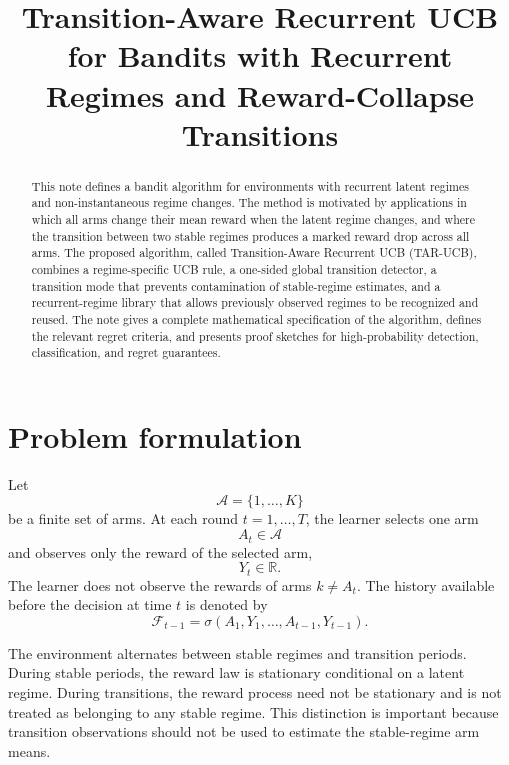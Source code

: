 \documentclass[11pt]{article}
\title{Transition-Aware Recurrent UCB for Bandits with Recurrent Regimes and Reward-Collapse Transitions}
\author{}
\date{}
\newcommand{\A}{\mathcal A}
\newcommand{\F}{\mathcal F}
\newcommand{\R}{\mathbb R}
\begin{document}
\maketitle

\begin{abstract}
This note defines a bandit algorithm for environments with recurrent latent regimes and non-instantaneous regime changes. The method is motivated by applications in which all arms change their mean reward when the latent regime changes, and where the transition between two stable regimes produces a marked reward drop across all arms. The proposed algorithm, called Transition-Aware Recurrent UCB (TAR-UCB), combines a regime-specific UCB rule, a one-sided global transition detector, a transition mode that prevents contamination of stable-regime estimates, and a recurrent-regime library that allows previously observed regimes to be recognized and reused. The note gives a complete mathematical specification of the algorithm, defines the relevant regret criteria, and presents proof sketches for high-probability detection, classification, and regret guarantees.
\end{abstract}

\section{Problem formulation}
\label{sec:problem_formulation}

Let
\begin{equation}
\label{eq:arm_set}
\A=\{1,\ldots,K\}
\end{equation}
be a finite set of arms. At each round $t=1,\ldots,T$, the learner selects one arm
\begin{equation}
\label{eq:chosen_arm}
A_t\in\A
\end{equation}
and observes only the reward of the selected arm,
\begin{equation}
\label{eq:observed_reward}
Y_t\in\R .
\end{equation}
The learner does not observe the rewards of arms $k\neq A_t$. The history available before the decision at time $t$ is denoted by
\begin{equation}
\label{eq:filtration}
\F_{t-1}
=
\sigma(A_1,Y_1,\ldots,A_{t-1},Y_{t-1}).
\end{equation}

The environment alternates between stable regimes and transition periods. During stable periods, the reward law is stationary conditional on a latent regime. During transitions, the reward process need not be stationary and is not treated as belonging to any stable regime. This distinction is important because transition observations should not be used to estimate the stable-regime arm means.
\end{document}
